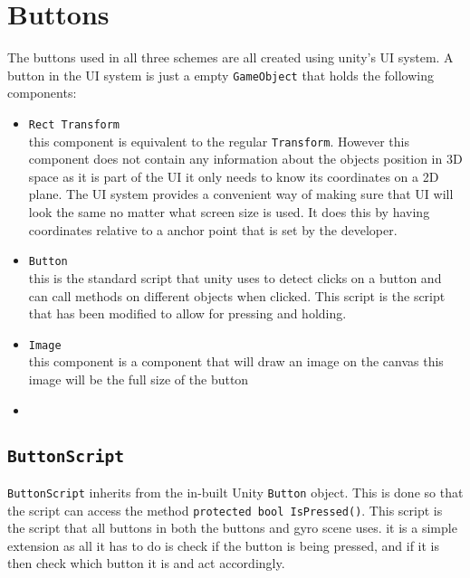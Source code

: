 \section{Buttons}
The buttons used in all three schemes are all created using unity's UI system. A button in the UI system is just a empty {\tt GameObject} that holds the following components:
\begin{itemize}
\item {\tt Rect Transform}\\
this component is equivalent to the regular {\tt Transform}.  However this component does not contain any information about the objects position in 3D space as it is part of the UI it only needs to know its coordinates on a 2D plane. The UI system provides a convenient way of making sure that UI will look the same no matter what screen size is used. It does this by having coordinates relative to a anchor point that is set by the developer. 
\item {\tt Button}\\
this is the standard script that unity uses to detect clicks on a button and can call methods on different objects when clicked. This script is the script that has been modified to allow for pressing and holding.
\item {\tt Image} \\
this component is a component that will draw an image on the canvas this image will be the full size of the button
\item 
\end{itemize}
\subsection{{\tt ButtonScript}}
{\tt ButtonScript} inherits from the in-built Unity {\tt Button} object. This is done so that the script can access the method {\tt   protected bool IsPressed()}. This script is the script that all buttons in both the buttons and gyro scene uses. it is a simple extension as all it has to do is check if the button is being pressed, and if it is then check which button it is and act accordingly. 
